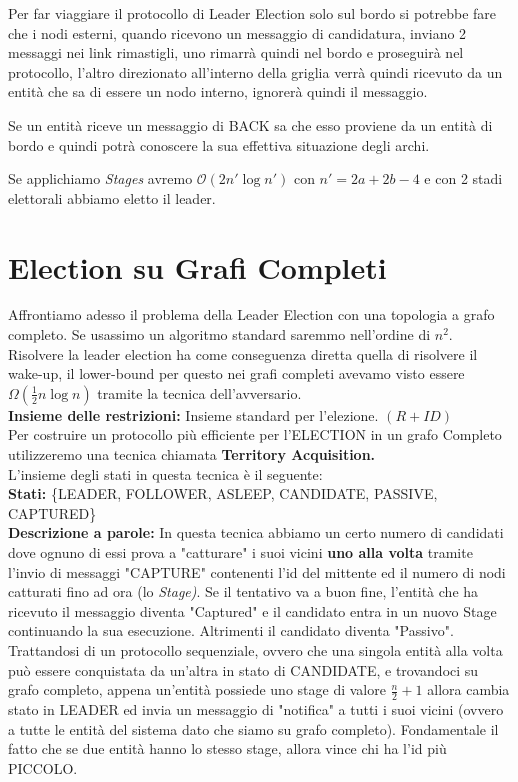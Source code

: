 Per far viaggiare il protocollo di Leader Election solo sul bordo si potrebbe fare che i nodi esterni, quando ricevono un messaggio di candidatura, inviano 2 messaggi nei link rimastigli, uno rimarrà quindi nel bordo e proseguirà nel protocollo, l'altro direzionato all'interno della griglia verrà quindi ricevuto da un entità che sa di essere un nodo interno, ignorerà quindi il messaggio.

Se un entità riceve un messaggio di BACK sa che esso proviene da un entità di bordo e quindi potrà conoscere la sua effettiva situazione degli archi.

Se applichiamo \emph{Stages} avremo $\mathcal{O}(2n' \log n')$ con $n' = 2a + 2b - 4$ e con 2 stadi elettorali abbiamo eletto il leader.

\section{Election su Grafi Completi}
Affrontiamo adesso il problema della Leader Election con una topologia a grafo completo. Se usassimo un algoritmo standard saremmo nell'ordine di $n^2$. Risolvere la leader election ha come conseguenza diretta quella di risolvere il wake-up, il lower-bound per questo nei grafi completi avevamo visto essere $\Omega(\frac{1}{2}n \log n)$ tramite la tecnica dell'avversario.\\
\textbf{Insieme delle restrizioni:} Insieme standard per l'elezione. $(R+ID)$\\
Per costruire un protocollo più efficiente per l'ELECTION in un grafo Completo utilizzeremo una tecnica chiamata \textbf{Territory Acquisition.}\\
L'insieme degli stati in questa tecnica è il seguente:\\
\textbf{Stati:} \{LEADER, FOLLOWER, ASLEEP, CANDIDATE, PASSIVE, CAPTURED\}\\
\textbf{Descrizione a parole:}
In questa tecnica abbiamo un certo numero di candidati dove ognuno di essi prova a "catturare" i suoi vicini \textbf{uno alla volta} tramite l'invio di messaggi "CAPTURE" contenenti l'id del mittente ed il numero di nodi catturati fino ad ora (lo \textit{Stage)}. Se il tentativo va a buon fine, l'entità che ha ricevuto il messaggio diventa "Captured" e il candidato entra in un nuovo Stage continuando la sua esecuzione. Altrimenti il candidato diventa "Passivo". Trattandosi di un protocollo sequenziale, ovvero che una singola entità alla volta può essere conquistata da un'altra in stato di CANDIDATE, e trovandoci su grafo completo, appena un'entità possiede uno stage di valore $\frac{n}{2} +1 $ allora cambia stato in LEADER ed invia un messaggio di "notifica" a tutti i suoi vicini (ovvero a tutte le entità del sistema dato che siamo su grafo completo). Fondamentale il fatto che se due entità hanno lo stesso stage, allora vince chi ha l'id più PICCOLO.\\ 
